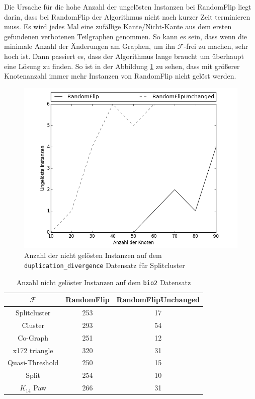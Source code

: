 \documentclass[12pt,a4paper,onecolumn,oneside,titlepage]{article}
\newcommand{\vars}{\texttt}
\newcommand\cursive[1]{\ensuremath{\mathcal{#1}}}
\begin{document}
Die Ursache für die hohe Anzahl der ungelösten Instanzen bei RandomFlip liegt darin, dass bei RandomFlip der Algorithmus nicht nach kurzer Zeit terminieren muss. Es wird jedes Mal eine zufällige Kante/Nicht-Kante aus dem ersten gefundenen verbotenen Teilgraphen genommen.
So kann es sein, dass wenn die minimale Anzahl der Änderungen am Graphen, um ihn \cursive{F}-frei zu machen, sehr hoch ist. Dann passiert es, dass der Algorithmus lange braucht um überhaupt eine Lösung zu finden. So ist in der Abbildung \ref{fig:not_solved} zu sehen, dass mit größerer Knotenanzahl immer mehr Instanzen von RandomFlip nicht gelöst werden.

\begin{figure}
    \centering
    \includegraphics[scale=0.4]{plots/not_solved.png}
    \caption{Anzahl der nicht gelösten Instanzen auf dem \vars{duplication\_divergence} Datensatz für Splitcluster}
    \label{fig:not_solved}
\end{figure}

\begin{table}
\centering
\begin{tabular}{c cc}
\cursive{F} &  RandomFlip & RandomFlipUnchanged  \\ 
\hline 
Splitcluster & 253 & 17 \\
Cluster & 293 & 54 \\
Co-Graph & 251 & 12 \\
x172 triangle & 320 & 31 \\
Quasi-Threshold & 250 & 15 \\
Split & 254 & 10  \\
$K_{14}$ Paw & 266 & 31\\
\end{tabular} 
\caption{Anzahl nicht gelöster Instanzen auf dem \vars{bio2} Datensatz}
\label{tab:benchmark_notsolved}
\end{table}
\end{document}
